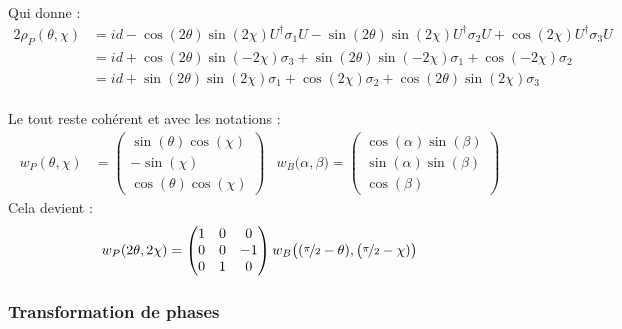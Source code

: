 \\
Qui donne :
\begin{align*}
	2\rho_P(\theta, \chi) &= id - \cos(2\theta) \sin(2\chi) U^\dagger \sigma_1 U - \sin(2\theta) \sin(2\chi) U^\dagger \sigma_2 U + \cos (2\chi) U^\dagger \sigma_3 U \\
	&= id + \cos(2\theta) \sin(-2\chi) \sigma_3 + \sin(2\theta) \sin(-2\chi)  \sigma_1 + \cos (-2\chi) \sigma_2 \\
	&= id + \sin(2\theta) \sin(2\chi)  \sigma_1 + \cos (2\chi) \sigma_2 + \cos(2\theta) \sin(2\chi) \sigma_3
\end{align*}
\\ 
Le tout reste cohérent et avec les notations :
\begin{align*}
	w_P(\theta, \chi) &= \begin{pmatrix}
		\sin(\theta) \cos(\chi) \\ -\sin (\chi) \\ \cos(\theta) \cos(\chi)
	\end{pmatrix}  &   w_B\big( \alpha, \beta \big) = \begin{pmatrix}
		\cos(\alpha) \sin(\beta) \\ \sin(\alpha) \sin(\beta) \\ \cos (\beta)
	\end{pmatrix}
\end{align*}
Cela devient :
\[w_P(2\theta, 2\chi) = \begin{pmatrix}
	1 & 0 & 0 \\ 0 & 0 & -1 \\ 0 & 1 & 0
\end{pmatrix} w_B\big( (\nicefrac{\pi}{2}-\theta ), \big(\nicefrac{\pi}{2}-\chi) \big)\]
\skipl 



\subsubsection{\todo Transformation de phases}

